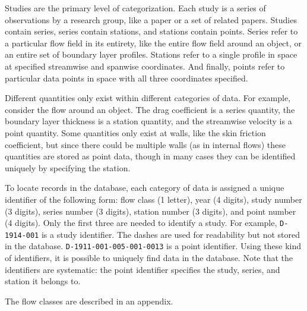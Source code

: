 Studies are the primary level of categorization.  Each study is a series of
observations by a research group, like a paper or a set of related papers.
Studies contain series, series contain stations, and stations contain points.
Series refer to a particular flow field in its entirety, like the entire flow
field around an object, or an entire set of boundary layer profiles.  Stations
refer to a single profile in space at specified streamwise and spanwise
coordinates.  And finally, points refer to particular data points in space with
all three coordinates specified.

Different quantities only exist within different categories of data.  For
example, consider the flow around an object.  The drag coefficient is a series
quantity, the boundary layer thickness is a station quantity, and the
streamwise velocity is a point quantity.  Some quantities only exist at walls,
like the skin friction coefficient, but since there could be multiple walls (as
in internal flows) these quantities are stored as point data, though in many
cases they can be identified uniquely by specifying the station.

To locate records in the database, each category of data is assigned a unique
identifier of the following form: flow class (1 letter), year (4 digits), study
number (3 digits), series number (3 digits), station number (3 digits), and
point number (4 digits).  Only the first three are needed to identify a study.
For example, \texttt{D-1914-001} is a study identifier.  The dashes are used
for readability but not stored in the database.
\texttt{D-1911-001-005-001-0013} is a point identifier.  Using these kind of
identifiers, it is possible to uniquely find data in the database.  Note that
the identifiers are systematic: the point identifier specifies the study,
series, and station it belongs to.

The flow classes are described in an appendix.

